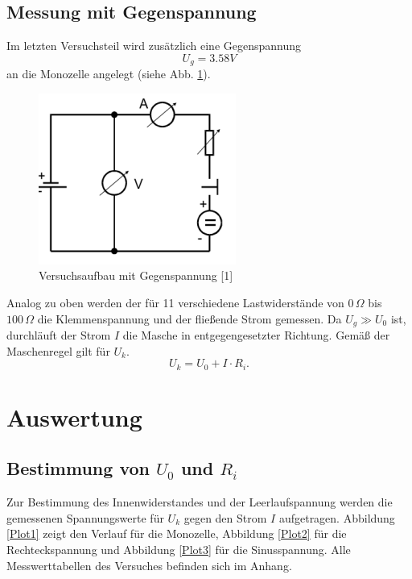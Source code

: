 \documentclass[11pt,ngerman,a4paper]{article}
\begin{document}
\subsection{Messung mit Gegenspannung}
Im letzten Versuchsteil wird zus\"atzlich eine Gegenspannung 
\[
U_g = 3.58 V 
\] an die Monozelle angelegt (siehe Abb. \ref{Aufbau2}). 
\begin{figure}[htp]
\centering
\includegraphics[scale=1.00]{abb2.png}
\caption{Versuchsaufbau mit Gegenspannung [1]}
\label{Aufbau2}
\end{figure}Analog zu oben werden der f\"ur 11 verschiedene Lastwiderst\"ande von $0\,\Omega$ bis $100\,\Omega$ die Klemmenspannung und der flie\ss ende Strom gemessen. Da $U_g \gg U_0$ ist, durchläuft der Strom $I$ die Masche in entgegengesetzter Richtung. Gemäß der Maschenregel gilt für $U_k$. 
\begin{equation}
U_k = U_0 + I\cdot R_i.
\end{equation}
\newpage
\section{Auswertung}


\subsection{Bestimmung von $U_0$ und $R_i$}
Zur Bestimmung des Innenwiderstandes und der Leerlaufspannung werden die gemessenen Spannungswerte f\"ur $U_k$ gegen den Strom $I$ aufgetragen. Abbildung \ref{Plot1} zeigt den Verlauf f\"ur die Monozelle, Abbildung \ref{Plot2} f\"ur die Rechteckspannung und Abbildung \ref{Plot3} f\"ur die Sinusspannung. Alle Messwerttabellen des Versuches befinden sich im Anhang.


 
\end{document}
